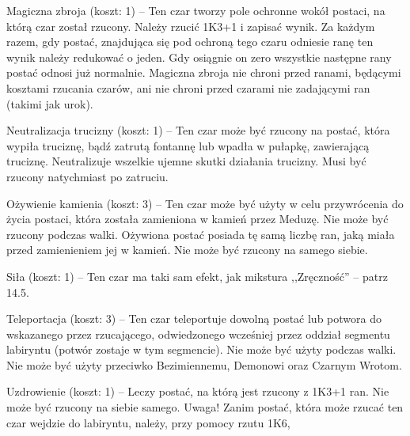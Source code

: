 Magiczna zbroja (koszt: 1) – Ten czar tworzy pole ochronne wokół postaci, na którą czar został rzucony.
Należy rzucić 1K3+1 i zapisać wynik.
Za każdym razem, gdy postać, znajdująca się pod ochroną tego czaru odniesie ranę ten wynik należy redukować o jeden.
Gdy osiągnie on zero wszystkie następne rany postać odnosi już normalnie.
Magiczna zbroja nie chroni przed ranami, będącymi kosztami rzucania czarów, ani nie chroni przed czarami nie zadającymi ran (takimi jak urok).

Neutralizacja trucizny (koszt: 1) – Ten czar może być rzucony na postać, która wypiła truciznę, bądź zatrutą fontannę lub wpadła w pułapkę, zawierającą truciznę.
Neutralizuje wszelkie ujemne skutki działania trucizny.
Musi być rzucony natychmiast po zatruciu.

Ożywienie kamienia (koszt: 3) – Ten czar może być użyty w celu przywrócenia do życia postaci, która została zamieniona w kamień przez Meduzę.
Nie może być rzucony podczas walki.
Ożywiona postać posiada tę samą liczbę ran, jaką miała przed zamienieniem jej w kamień.
Nie może być rzucony na samego siebie.

Siła (koszt: 1) – Ten czar ma taki sam efekt, jak mikstura ,,Zręczność'' – patrz 14.5.

Teleportacja (koszt: 3) – Ten czar teleportuje dowolną postać lub potwora do wskazanego przez rzucającego, odwiedzonego wcześniej przez oddział segmentu labiryntu (potwór zostaje w tym segmencie).
Nie może być użyty podczas walki.
Nie może być użyty przeciwko Bezimiennemu, Demonowi oraz Czarnym Wrotom.

Uzdrowienie (koszt: 1) – Leczy postać, na którą jest rzucony z 1K3+1 ran.
Nie może być rzucony na siebie samego.
Uwaga!
Zanim postać, która może rzucać ten czar wejdzie do labiryntu, należy, przy pomocy rzutu 1K6,